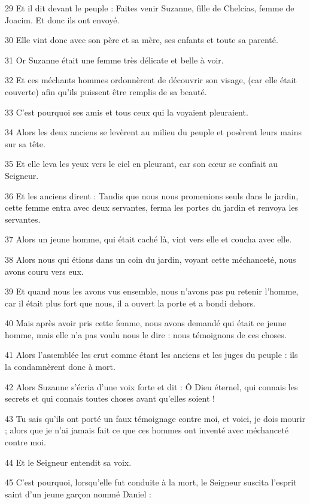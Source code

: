 \par 29 Et il dit devant le peuple : Faites venir Suzanne, fille de Chelcias, femme de Joacim. Et donc ils ont envoyé.
\par 30 Elle vint donc avec son père et sa mère, ses enfants et toute sa parenté.
\par 31 Or Suzanne était une femme très délicate et belle à voir.
\par 32 Et ces méchants hommes ordonnèrent de découvrir son visage, (car elle était couverte) afin qu'ils puissent être remplis de sa beauté.
\par 33 C'est pourquoi ses amis et tous ceux qui la voyaient pleuraient.
\par 34 Alors les deux anciens se levèrent au milieu du peuple et posèrent leurs mains sur sa tête.
\par 35 Et elle leva les yeux vers le ciel en pleurant, car son cœur se confiait au Seigneur.
\par 36 Et les anciens dirent : Tandis que nous nous promenions seuls dans le jardin, cette femme entra avec deux servantes, ferma les portes du jardin et renvoya les servantes.
\par 37 Alors un jeune homme, qui était caché là, vint vers elle et coucha avec elle.
\par 38 Alors nous qui étions dans un coin du jardin, voyant cette méchanceté, nous avons couru vers eux.
\par 39 Et quand nous les avons vus ensemble, nous n'avons pas pu retenir l'homme, car il était plus fort que nous, il a ouvert la porte et a bondi dehors.
\par 40 Mais après avoir pris cette femme, nous avons demandé qui était ce jeune homme, mais elle n'a pas voulu nous le dire : nous témoignons de ces choses.
\par 41 Alors l'assemblée les crut comme étant les anciens et les juges du peuple : ils la condamnèrent donc à mort.
\par 42 Alors Suzanne s'écria d'une voix forte et dit : Ô Dieu éternel, qui connais les secrets et qui connais toutes choses avant qu'elles soient !
\par 43 Tu sais qu'ils ont porté un faux témoignage contre moi, et voici, je dois mourir ; alors que je n’ai jamais fait ce que ces hommes ont inventé avec méchanceté contre moi.
\par 44 Et le Seigneur entendit sa voix.
\par 45 C'est pourquoi, lorsqu'elle fut conduite à la mort, le Seigneur suscita l'esprit saint d'un jeune garçon nommé Daniel :
